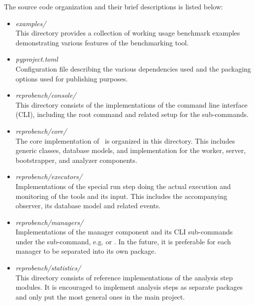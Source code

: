 The source code organization and their brief descriptions is listed below:
\begin{itemize}
    \item \emph{examples/}\\
          This directory provides a collection of working usage benchmark examples demonstrating various features of the benchmarking tool.

    \item \emph{pyproject.toml}\\
          Configuration file describing the various dependencies used and the packaging options used for publishing purposes.

    \item \emph{reprobench/console/}\\
          This directory consists of the implementations of the command line interface (CLI), including the  root command and related setup for the sub-commands.

    \item \emph{reprobench/core/}\\
          The core implementation of \OurBenchmarkingTool~is organized in this directory.
          This includes generic classes, database models, and implementation for the worker, server, bootstrapper, and analyzer components.

    \item \emph{reprobench/executors/}\\
          Implementations of the special run step doing the actual execution and monitoring of the tools and its input.
          This includes the accompanying observer, its database model and related events.

    \item \emph{reprobench/managers/}\\
          Implementations of the manager component and its CLI sub-commands under the  sub-command, e.g.  or .
          In the future, it is preferable for each manager to be separated into its own package.

    \item \emph{reprobench/statistics/}\\
          This directory consists of reference implementations of the analysis step modules.
          It is encouraged to implement analysis steps as separate packages and only put the most general ones in the main project.


\end{itemize}
